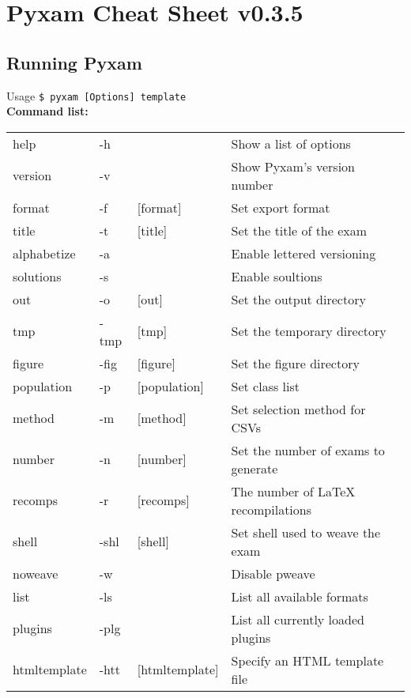 \documentclass[9pt]{extarticle}
\begin{document}
\centering\section*{Pyxam Cheat Sheet v0.3.5}
\begin{multicols}{2}
\raggedright\subsection*{Running Pyxam}
Usage \texttt{\$ pyxam [Options] template} \\
{\bf Command list:} \\
\begin{tabular}{l l l l}

help         & -h     &                & Show a list of options \\
version      & -v     &                & Show Pyxam's version number \\
format       & -f     & [format]       & Set export format \\
title        & -t     & [title]        & Set the title of the exam \\
alphabetize  & -a     &                & Enable lettered versioning \\
solutions    & -s     &                & Enable soultions \\
out          & -o     & [out]          & Set the output directory \\
tmp          & -tmp   & [tmp]          & Set the temporary directory \\
figure       & -fig   & [figure]       & Set the figure directory \\
population   & -p     & [population]   & Set class list \\
method       & -m     & [method]       & Set selection method for CSVs \\
number       & -n     & [number]       & Set the number of exams to generate \\
recomps      & -r     & [recomps]      & The number of LaTeX recompilations \\
shell        & -shl   & [shell]        & Set shell used to weave the exam \\
noweave      & -w     &                & Disable pweave \\
list         & -ls    &                & List all available formats \\
plugins      & -plg   &                & List all currently loaded plugins \\
htmltemplate & -htt   & [htmltemplate] & Specify an HTML template file \\

\end{tabular}
\end{multicols}
\end{document}
